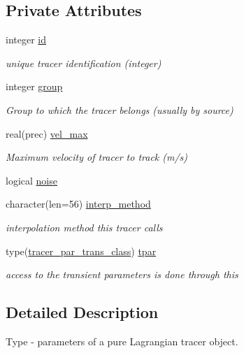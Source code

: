 \subsection*{Private Attributes}
\begin{DoxyCompactItemize}
\item 
integer \mbox{\hyperlink{structtracer__base_1_1tracer__par__class_ad7d0637c337b16787b0469e0bf5dfced}{id}}
\begin{DoxyCompactList}\small\item\em unique tracer identification (integer) \end{DoxyCompactList}\item 
integer \mbox{\hyperlink{structtracer__base_1_1tracer__par__class_ad943229367c5ab92dc815f23b0ee6aad}{group}}
\begin{DoxyCompactList}\small\item\em Group to which the tracer belongs (usually by source) \end{DoxyCompactList}\item 
real(prec) \mbox{\hyperlink{structtracer__base_1_1tracer__par__class_a04159d779af0b8bc161100b0cb83a3b1}{vel\+\_\+max}}
\begin{DoxyCompactList}\small\item\em Maximum velocity of tracer to track (m/s) \end{DoxyCompactList}\item 
logical \mbox{\hyperlink{structtracer__base_1_1tracer__par__class_a6ed144d3b2b37e7e6d3fe9294cbb568d}{noise}}
\item 
character(len=56) \mbox{\hyperlink{structtracer__base_1_1tracer__par__class_ae32e258384f0f03418bf8f3aa0181662}{interp\+\_\+method}}
\begin{DoxyCompactList}\small\item\em interpolation method this tracer calls \end{DoxyCompactList}\item 
type(\mbox{\hyperlink{structtracer__base_1_1tracer__par__trans__class}{tracer\+\_\+par\+\_\+trans\+\_\+class}}) \mbox{\hyperlink{structtracer__base_1_1tracer__par__class_a75aac21ea81301a4358ccc3d0df8236a}{tpar}}
\begin{DoxyCompactList}\small\item\em access to the transient parameters is done through this \end{DoxyCompactList}\end{DoxyCompactItemize}


\subsection{Detailed Description}
Type -\/ parameters of a pure Lagrangian tracer object. 

